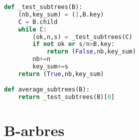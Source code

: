 \documentclass{article}
\begin{document}
\newpage
\begin{lstlisting}[language=Python]
def _test_subtrees(B):
    (nb,key_sum) = (1,B.key)
    C = B.child
    while C:
        (ok,n,s) = _test_subtrees(C)
        if not ok or s/n>B.key:
            return (False,nb,key_sum)
        nb+=n
        key_sum+=s
    return (True,nb,key_sum)

def average_subtrees(B):
    return _test_subtrees(B)[0]
\end{lstlisting}



\section{B-arbres}
\end{document}

